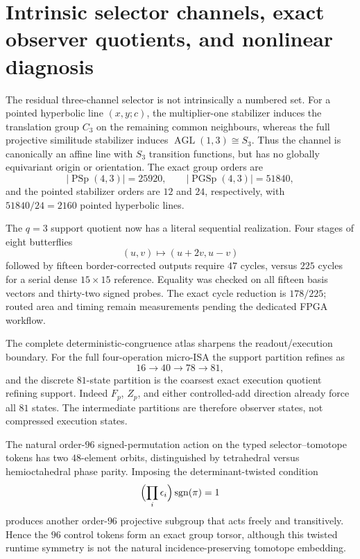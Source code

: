 \section{Intrinsic selector channels, exact observer quotients, and nonlinear diagnosis}
\label{sec:bt2901-2907}

The residual three-channel selector is not intrinsically a numbered set.  For a pointed
hyperbolic line $(x,y;c)$, the multiplier-one stabilizer induces the translation group
$C_3$ on the remaining common neighbours, whereas the full projective similitude
stabilizer induces $\operatorname{AGL}(1,3)\cong S_3$.  Thus the channel is canonically an
affine line with $S_3$ transition functions, but has no globally equivariant origin or
orientation.  The exact group orders are
\[
 |\operatorname{PSp}(4,3)|=25920,\qquad
 |\operatorname{PGSp}(4,3)|=51840,
\]
and the pointed stabilizer orders are $12$ and $24$, respectively, with
$51840/24=2160$ pointed hyperbolic lines.

The $q=3$ support quotient now has a literal sequential realization.  Four stages of
eight butterflies
\[
 (u,v)\longmapsto(u+2v,u-v)
\]
followed by fifteen border-corrected outputs require $47$ cycles, versus $225$ cycles for
a serial dense $15\times15$ reference.  Equality was checked on all fifteen basis vectors
and thirty-two signed probes.  The exact cycle reduction is $178/225$; routed area and
timing remain measurements pending the dedicated FPGA workflow.

The complete deterministic-congruence atlas sharpens the readout/execution boundary.  For
the full four-operation micro-ISA the support partition refines as
\[
 16\longrightarrow40\longrightarrow78\longrightarrow81,
\]
and the discrete $81$-state partition is the coarsest exact execution quotient refining
support.  Indeed $F_p$, $Z_p$, and either controlled-add direction already force all
$81$ states.  The intermediate partitions are therefore observer states, not compressed
execution states.

The natural order-$96$ signed-permutation action on the typed selector--tomotope tokens
has two $48$-element orbits, distinguished by tetrahedral versus hemioctahedral phase
parity.  Imposing the determinant-twisted condition
\[
  \Bigl(\prod_i\epsilon_i\Bigr)\operatorname{sgn}(\pi)=1
\]
produces another order-$96$ projective subgroup that acts freely and transitively.  Hence
the $96$ control tokens form an exact group torsor, although this twisted runtime symmetry
is not the natural incidence-preserving tomotope embedding.

